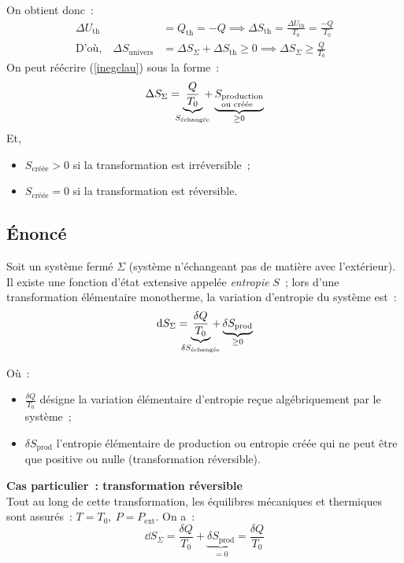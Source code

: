 \documentclass{article}
\let\oldref\ref
\renewcommand{\ref}[1]{(\oldref{#1})}
\newcommand{\ext}{\text{ext}}
\newcommand{\tprod}{\text{prod}}
\newcommand{\creee}{\text{créée}}
\renewcommand{\th}{\mathrm{th}}
\newcommand{\echangee}{\text{échangée}}
\begin{document}
\begin{tableau}
    On obtient donc~:
    \begin{align}
        \Delta U_\th &= Q_\th = -Q \implies \Delta S_\th = \frac{\Delta U_\th}{T_0} = \frac{-Q}{T_0} \nonumber \\
        \text{D'où,}\quad \Delta S_{\text{univers}} &= \Delta S_\Sigma + \Delta S_\th \geq 0 \implies \Delta S_\Sigma \geq \frac{Q}{T_0} \label{inegclau}
    \end{align}
    On peut réécrire \ref{inegclau} sous la forme~:
    $$\Delta S_\Sigma = \underbrace{\frac{Q}{T_0}}_{\mathclap{S_\echangee}} + \underbrace{S_{\begin{subarray}{l}\text{production}\\\text{ou créée}\end{subarray}}}_{\geq 0}$$
    Et,
    \begin{itemize}
        \item $S_\creee > 0$ si la transformation est irréversible~;
        \item $S_\creee = 0$ si la transformation est réversible.
    \end{itemize}
\end{tableau}

\subsection{Énoncé}
\begin{tableau}
    \begin{enonce}[Énoncé]
        Soit un système fermé $\Sigma$ (système n'échangeant pas de matière avec l'extérieur). Il existe une fonction d'état extensive appelée \textit{entropie} $S$~; lors d'une transformation élémentaire monotherme, la variation d'entropie du système est~:
        $$\dd{S_\Sigma} = \underbrace{\frac{\delta Q}{T_0}}_{\mathclap{\delta S_\echangee}} + \underbrace{\delta S_\tprod}_{\geq 0}$$
    \end{enonce}
    Où~:\nobreak
    \begin{itemize}[beginpenalty=10000] %
        \item $\frac{\delta Q}{T_0}$ désigne la variation élémentaire d'entropie reçue algébriquement par le système~;
        \item $\delta S_\tprod$ l'entropie élémentaire de production ou entropie créée qui ne peut être que positive ou nulle (transformation réversible).
    \end{itemize}
    \tcbline
    \textbf{Cas particulier~: transformation réversible}\\
    Tout au long de cette transformation, les équilibres mécaniques et thermiques sont assurés~: $T=T_0,\ P=P_\ext$. On a~:
    $$\dd{S_\Sigma} = \frac{\delta Q}{T_0} + \underbrace{\delta S_\tprod}_{= 0} = \frac{\delta Q}{T_0}$$
\end{tableau}
\end{document}

